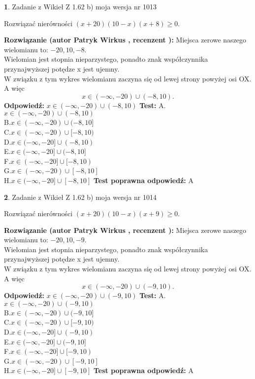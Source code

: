 \documentclass[12pt, a4paper]{article}
\theoremstyle{definition} %
\newtheorem{zad}{}
\newcommand{\zadStart}[1]{\begin{zad}#1\newline}
\newcommand{\zadStop}{\end{zad}}
\newcommand{\rozwStart}[2]{\noindent \textbf{Rozwiązanie (autor #1 , recenzent #2): }\newline}
\newcommand{\rozwStop}{\newline}
\newcommand{\odpStart}{\noindent \textbf{Odpowiedź:}\newline}
\newcommand{\odpStop}{\newline}
\newcommand{\testStart}{\noindent \textbf{Test:}\newline}
\newcommand{\testStop}{\newline}
\newcommand{\kluczStart}{\noindent \textbf{Test poprawna odpowiedź:}\newline}
\newcommand{\kluczStop}{\newline}
\begin{document}
\zadStart{Zadanie z Wikieł Z 1.62 b) moja wersja nr 1013}

Rozwiązać nierówności $(x+20)(10-x)(x+8)\ge0$.
\zadStop
\rozwStart{Patryk Wirkus}{}
Miejsca zerowe naszego wielomianu to: $-20, 10, -8$.\\
Wielomian jest stopnia nieparzystego, ponadto znak współczynnika przy\linebreak najwyższej potędze x jest ujemny.\\ W związku z tym wykres wielomianu zaczyna się od lewej strony powyżej osi OX. A więc $$x \in (-\infty,-20) \cup (-8,10).$$
\rozwStop
\odpStart
$x \in (-\infty,-20) \cup (-8,10)$
\odpStop
\testStart
A.$x \in (-\infty,-20) \cup (-8,10)$\\
B.$x \in (-\infty,-20) \cup (-8,10]$\\
C.$x \in (-\infty,-20) \cup [-8,10)$\\
D.$x \in (-\infty,-20] \cup (-8,10)$\\
E.$x \in (-\infty,-20] \cup (-8,10]$\\
F.$x \in (-\infty,-20] \cup [-8,10)$\\
G.$x \in (-\infty,-20) \cup [-8,10]$\\
H.$x \in (-\infty,-20] \cup [-8,10]$
\testStop
\kluczStart
A
\kluczStop



\zadStart{Zadanie z Wikieł Z 1.62 b) moja wersja nr 1014}

Rozwiązać nierówności $(x+20)(10-x)(x+9)\ge0$.
\zadStop
\rozwStart{Patryk Wirkus}{}
Miejsca zerowe naszego wielomianu to: $-20, 10, -9$.\\
Wielomian jest stopnia nieparzystego, ponadto znak współczynnika przy\linebreak najwyższej potędze x jest ujemny.\\ W związku z tym wykres wielomianu zaczyna się od lewej strony powyżej osi OX. A więc $$x \in (-\infty,-20) \cup (-9,10).$$
\rozwStop
\odpStart
$x \in (-\infty,-20) \cup (-9,10)$
\odpStop
\testStart
A.$x \in (-\infty,-20) \cup (-9,10)$\\
B.$x \in (-\infty,-20) \cup (-9,10]$\\
C.$x \in (-\infty,-20) \cup [-9,10)$\\
D.$x \in (-\infty,-20] \cup (-9,10)$\\
E.$x \in (-\infty,-20] \cup (-9,10]$\\
F.$x \in (-\infty,-20] \cup [-9,10)$\\
G.$x \in (-\infty,-20) \cup [-9,10]$\\
H.$x \in (-\infty,-20] \cup [-9,10]$
\testStop
\kluczStart
A
\kluczStop
\end{document}
